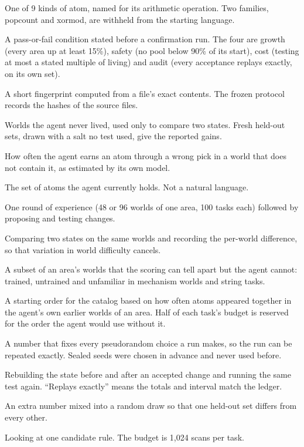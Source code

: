 \documentclass[11pt]{article}
\begin{document}
\begin{description}[leftmargin=*,style=nextline]
\item[Family] One of 9 kinds of atom, named for its arithmetic operation. Two families, popcount and xormod, are withheld from the starting language.
\item[Gate] A pass-or-fail condition stated before a confirmation run. The four are growth (every area up at least 15\%), safety (no pool below 90\% of its start), cost (testing at most a stated multiple of living) and audit (every acceptance replays exactly, on its own set).
\item[Hash] A short fingerprint computed from a file's exact contents. The frozen protocol records the hashes of the source files.
\item[Held-out set] Worlds the agent never lived, used only to compare two states. Fresh held-out sets, drawn with a salt no test used, give the reported gains.
\item[Import rate] How often the agent earns an atom through a wrong pick in a world that does not contain it, as estimated by its own model.
\item[Language] The set of atoms the agent currently holds. Not a natural language.
\item[Life] One round of experience (48 or 96 worlds of one area, 100 tasks each) followed by proposing and testing changes.
\item[Paired comparison] Comparing two states on the same worlds and recording the per-world difference, so that variation in world difficulty cancels.
\item[Pool] A subset of an area's worlds that the scoring can tell apart but the agent cannot: trained, untrained and unfamiliar in mechanism worlds and string tasks.
\item[Prior (search prior)] A starting order for the catalog based on how often atoms appeared together in the agent's own earlier worlds of an area. Half of each task's budget is reserved for the order the agent would use without it.
\item[Random seed] A number that fixes every pseudorandom choice a run makes, so the run can be repeated exactly. Sealed seeds were chosen in advance and never used before.
\item[Replay] Rebuilding the state before and after an accepted change and running the same test again. ``Replays exactly'' means the totals and interval match the ledger.
\item[Salt] An extra number mixed into a random draw so that one held-out set differs from every other.
\item[Scan] Looking at one candidate rule. The budget is 1,024 scans per task.

\end{description}
\end{document}

